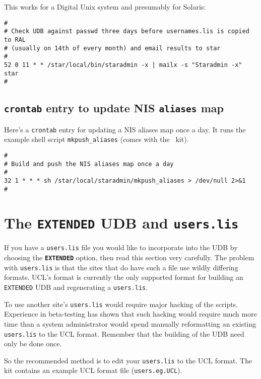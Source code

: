 This works for a Digital Unix system and presumably for Solaris:

\begin{verbatim}
#
# Check UDB against passwd three days before usernames.lis is copied to RAL
# (usually on 14th of every month) and email results to star
#
52 0 11 * * /star/local/bin/staradmin -x | mailx -s "Staradmin -x" star
#
\end{verbatim}

\subsection{{\tt crontab} entry to update NIS {\tt aliases} map}
\label{cronalias}

Here's a {\tt crontab} entry for updating a NIS aliases map once a day.
It runs the example shell script {\tt mkpush\_aliases} (comes with the
\staradmin\ kit).

\begin{verbatim}
#
# Build and push the NIS aliases map once a day
#
32 1 * * * sh /star/local/staradmin/mkpush_aliases > /dev/null 2>&1
#
\end{verbatim}


\appendix
\newpage
\section{The {\tt EXTENDED} UDB and {\tt users.lis}}
\label{ifusers}

If you have a {\tt users.lis} file you would like to incorporate into the
UDB by choosing the {\bf\tt EXTENDED} option, then read this section very
carefully. The problem with {\tt users.lis} is that the sites that do have
such a file use wildly differing formats. UCL's format is currently the
only supported format for building an {\tt EXTENDED} UDB and regenerating
a {\tt users.lis}.

To use another site's {\tt users.lis} would require major hacking of the
scripts. Experience in beta-testing has shown that such hacking would
require much more time than a system administrator would spend manually
reformatting an existing {\tt users.lis} to the UCL format. Remember that
the building of the UDB need only be done once.

So the recommended method is to edit your {\tt users.lis} to the UCL
format.  The kit contains an example UCL format file ({\tt users.eg.UCL}).

